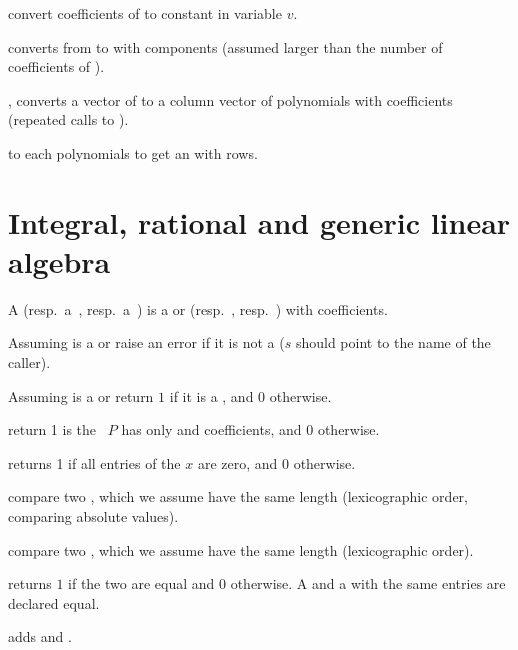 convert coefficients of  to
constant  in variable $v$.


 converts from  to 
with  components (assumed larger than the number of coefficients of
).

, converts a vector of  to a column
vector of polynomials with  coefficients (repeated calls to
).

  to each polynomials
to get an  with  rows.

\section{Integral, rational and generic linear algebra}
 A  (resp.~a~,
resp.~a~) is a  or  (resp.~,
resp.~) with  coefficients.


 Assuming  is a 
or  raise an error if it is not a  ($s$ should point to the
name of the caller).

 Assuming  is a 
or  return $1$ if it is a , and $0$ otherwise.

 return 1 is the ~$P$ has only
 and  coefficients, and 0 otherwise.

 returns 1 if all entries of the  $x$ are
zero, and $0$ otherwise.

 compare two , which we assume have
the same length (lexicographic order, comparing absolute values).

 compare two , which we assume have
the same length (lexicographic order).

 returns $1$ if the two  are equal
and $0$ otherwise. A  and a  with the same entries are
declared equal.

 adds  and .

